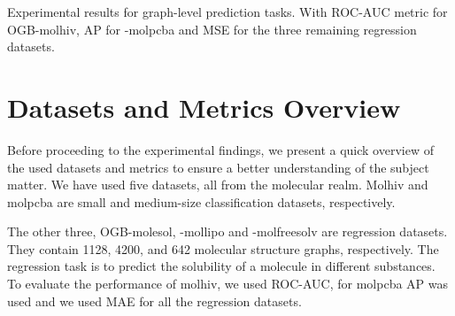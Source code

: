 \begin{table*}[t]
    \caption{
        Experimental results for graph-level prediction tasks. With ROC-AUC metric for OGB-molhiv, AP for -molpcba and MSE for the three remaining regression datasets.
    }\label{tbl:eval:results}
    \centering
    {\small%
        }
\end{table*}






\section{Datasets and Metrics Overview}

Before proceeding to the experimental findings, we present a quick overview of the used datasets and metrics to ensure a better understanding of the subject matter. We have used five datasets, all from the molecular realm. Molhiv and molpcba are small and medium-size classification datasets, respectively.

The other three, OGB-molesol, -mollipo and -molfreesolv are regression datasets. They contain 1128, 4200, and 642
molecular structure graphs, respectively. The regression task is to predict the solubility
of a molecule in different substances.
To evaluate the performance of molhiv, we used ROC-AUC, for molpcba AP was used and we used MAE for all the regression datasets.

